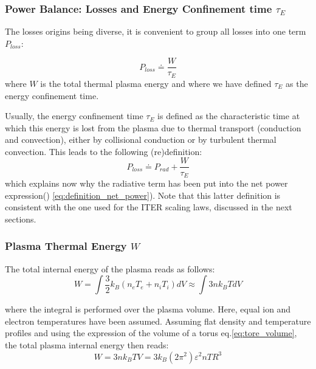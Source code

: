 \subsubsection{Power Balance: Losses and Energy Confinement time $\tau_E$}

The losses origins being diverse, it is convenient to group all losses into one term $P_{loss}$\cite[p.9]{Wesson2004}:

\begin{equation}
	P_{loss} 
	\doteq 
	\frac{ W }{ \tau_E } 
\label{eq:definition_confinement_time_global}
\end{equation}
\noindent
where $W$ is the total thermal plasma energy and where we have defined $\tau_E$ as the energy confinement time. 

Usually, the energy confinement time $\tau_E$ is defined as the characteristic time at which this energy is lost from the plasma due to thermal transport (conduction and convection), either by collisional conduction or by turbulent thermal convection. This leads to the following (re)definition\cite[(3.2)]{FusionCEA1987}:
\begin{equation}
	P_{loss} 
	\doteq 
	P_{rad}
	+
	\frac{ W }{ \tau_E } 
\label{eq:definition_confinement_time}
\end{equation}
\noindent
which explains now why the radiative term has been put into the net power expression() \ref{eq:definition_net_power}). Note that this latter definition is consistent with the one used for the ITER scaling laws, discussed in the next sections.


\subsubsection{Plasma Thermal Energy $W$}
The total internal energy of the plasma reads as follows:
\begin{equation*}
W  = \int \frac{3}{2} k_B \left( n_e T_e + n_i T_i \right ) dV 
\approx \int 3 n k_BT dV
\end{equation*}

\noindent
where the integral is performed over the plasma volume. Here, equal ion and electron temperatures have been assumed. Assuming flat density and temperature profiles and using the expression of the volume of a torus eq.\ref{eq:tore_volume}, the total plasma internal energy then reads:
\begin{equation}
W = 3 n k_B T V = 3 k_B (2\pi^2) \varepsilon^2  n T R^3
\label{eq:total_energy_natural_units}
\end{equation}




